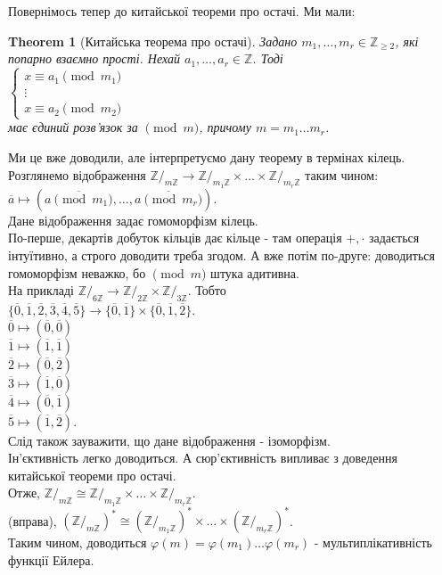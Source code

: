 \documentclass[a4paper, 14pt]{extarticle}
\theoremstyle{theoremdd}
\newtheorem{theorem}{Theorem}[subsection]
\theoremstyle{theoremdd}
\theoremstyle{theoremdd}
\theoremstyle{theoremdd}
\theoremstyle{theoremdd}
\theoremstyle{theoremdd}
\theoremstyle{theoremdd}
\theoremstyle{theoremdd}
\begin{document}
Повернімось тепер до китайської теореми про остачі. Ми мали:
\begin{theorem}[Китайська теорема про остачі]
Задано $m_1,\dots,m_r \in \mathbb{Z}_{\geq 2}$, які попарно взаємно прості. Нехай $a_1,\dots,a_r \in \mathbb{Z}$. Тоді\\
$\begin{cases} x \equiv a_1 \pmod{m_1} \\ \vdots \\ x \equiv a_2 \pmod{m_2} \end{cases}$\\
має єдиний розв'язок за $\pmod m$, причому $m = m_1 \dots m_r$.
\end{theorem}
Ми це вже доводили, але інтерпретуємо дану теорему в термінах кілець.\\
Розглянемо відображення $\mathbb{Z}/_{m \mathbb{Z}} \to \mathbb{Z}/_{m_1 \mathbb{Z}} \times \dots \times \mathbb{Z}/_{m_r \mathbb{Z}}$ таким чином:\\
$\overline{a} \mapsto (\overline{a \pmod {m_1}}, \dots, \overline{a \pmod {m_r}} )$.\\
Дане відображення задає гомоморфізм кілець.\\
По-перше, декартів добуток кільців дає кільце - там операція $+,\cdot$ задається інтуїтивно, а строго доводити треба згодом. А вже потім по-друге: доводиться гомоморфізм неважко, бо $\pmod m$ штука адитивна.
\bigskip \\
На прикладі $\mathbb{Z}/_{6 \mathbb{Z}} \to \mathbb{Z}/_{2 \mathbb{Z}} \times \mathbb{Z}/_{3 \mathbb{Z}}$. Тобто\\
$\{ \overline{0},\overline{1},\overline{2},\overline{3},\overline{4},\overline{5} \} \to \{\overline{0},\overline{1}\} \times \{\overline{0},\overline{1},\overline{2}\}$.\\
$\overline{0} \mapsto (\overline{0},\overline{0})$\\
$\overline{1} \mapsto (\overline{1},\overline{1})$\\
$\overline{2} \mapsto (\overline{0},\overline{2})$\\
$\overline{3} \mapsto (\overline{1},\overline{0})$\\
$\overline{4} \mapsto (\overline{0},\overline{1})$\\
$\overline{5} \mapsto (\overline{1},\overline{2})$.
\bigskip \\
Слід також зауважити, що дане відображення - ізоморфізм.\\
Ін'єктивність легко доводиться. А сюр'єктивність випливає з доведення китайської теореми про остачі.\\
Отже, $\mathbb{Z}/_{m \mathbb{Z}} \cong \mathbb{Z}/_{m_1 \mathbb{Z}} \times \dots \times \mathbb{Z}/_{m_r \mathbb{Z}}$.\\
(вправа), $(\mathbb{Z}/_{m \mathbb{Z}})^* \cong (\mathbb{Z}/_{m_1 \mathbb{Z}})^* \times \dots \times (\mathbb{Z}/_{m_r \mathbb{Z}})^*$.\\
Таким чином, доводиться $\varphi(m) = \varphi(m_1) \dots \varphi(m_r)$ - мультиплікативність функції Ейлера.
\end{document}
